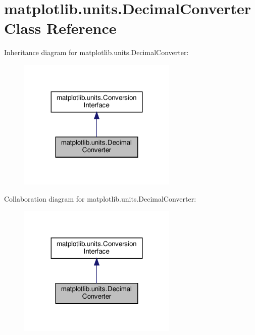 \hypertarget{classmatplotlib_1_1units_1_1DecimalConverter}{}\section{matplotlib.\+units.\+Decimal\+Converter Class Reference}
\label{classmatplotlib_1_1units_1_1DecimalConverter}


Inheritance diagram for matplotlib.\+units.\+Decimal\+Converter\+:
\nopagebreak
\begin{figure}[H]
\begin{center}
\leavevmode
\includegraphics[width=215pt]{classmatplotlib_1_1units_1_1DecimalConverter__inherit__graph}
\end{center}
\end{figure}


Collaboration diagram for matplotlib.\+units.\+Decimal\+Converter\+:
\nopagebreak
\begin{figure}[H]
\begin{center}
\leavevmode
\includegraphics[width=215pt]{classmatplotlib_1_1units_1_1DecimalConverter__coll__graph}
\end{center}
\end{figure}

